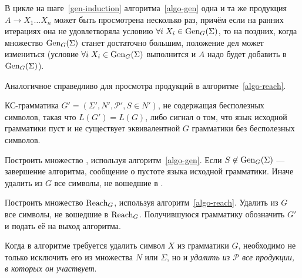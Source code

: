 \begin{myremark}
В цикле на шаге~\ref{gen-induction} алгоритма~\ref{algo-gen}
одна и та же продукция $A \to X_1 \ldots X_n$
может быть просмотрена несколько раз, причём если на ранних итерациях она не
удовлетворяла условию $\forall i \; X_i \in \operatorname{Gen}_G(\Sigma)$, то на поздних,
когда множество $\operatorname{Gen}_G(\Sigma)$ станет достаточно большим, положение дел может
измениться (условие $\forall i \; X_i \in \operatorname{Gen}_G(\Sigma)$ выполнится и $A$ надо
будет добавить в $\operatorname{Gen}_G(\Sigma)$).

Аналогичное справедливо для просмотра продукций в алгоритме~\ref{algo-reach}.
\end{myremark}

{КС-грамматика $G'=(\Sigma', N', \mathcal P', S \in N')$, не
содержащая бесполезных символов, такая что $L(G') = L(G)$, либо сигнал о том,
что язык исходной грамматики пуст и не существует эквивалентной $G$
грамматики без бесполезных символов.}
{
  \item Построить множество \GenGS, используя алгоритм~\ref{algo-gen}. Если
  $S \not \in \operatorname{Gen}_G(\Sigma)$ — завершение алгоритма, сообщение о пустоте языка исходной
  грамматики. Иначе удалить из $G$ все символы, не вошедшие в \GenGS.
  \item Построить множество $\operatorname{Reach}_G$, используя алгоритм~\ref{algo-reach}.
  Удалить из $G$ все символы, не вошедшие в $\operatorname{Reach}_G$. Получившуюся грамматику
  обозначить $G'$ и подать её на выход алгоритма.
}

\begin{myremark}
Когда в алгоритме требуется удалить символ $X$ из грамматики $G$, необходимо
не только исключить его из множества $N$ или $\Sigma$, но и \emph{удалить из
$\mathcal P$ все продукции, в которых он участвует}.
\end{myremark}

